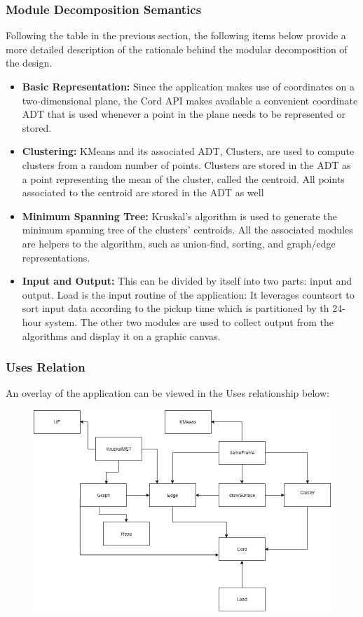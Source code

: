 \documentclass[12pt]{article}
\begin{document}
\subsubsection{Module Decomposition Semantics}
Following the table in the previous section, the following items below provide a more detailed
description of the rationale behind the modular decomposition of the design.
\begin{itemize}
\item \textbf{Basic Representation:} Since the application makes use of 
coordinates on a two-dimensional plane, the Cord API makes available a 
convenient coordinate ADT that is used whenever a point in the plane needs
to be represented or stored.
\item \textbf{Clustering:} KMeans and its associated ADT, Clusters, are used
to compute clusters from a random number of points. Clusters are stored in the
ADT as a point representing the mean of the cluster, called the centroid.
All points associated to the centroid are stored in the ADT as well
\item \textbf{Minimum Spanning Tree:} Kruskal's algorithm is used to generate
the minimum spanning tree of the clusters' centroids. All the associated modules
are helpers to the algorithm, such as union-find, sorting, and graph/edge
representations.
\item \textbf{Input and Output:} This can be divided by itself into two parts:
input and output. Load is the input routine of the application: It leverages
countsort to sort input data according to the pickup time which is 
partitioned by th 24-hour system. The other two modules are used to collect
output from the algorithms and display it on a graphic canvas.
\end{itemize}

\newpage
\subsubsection{Uses Relation}
An overlay of the application can be viewed in the Uses relationship below:
\begin{figure}[h]
\centering
\includegraphics[width=1.0\textwidth]{UsesDiagram.png}
\end{figure}
\newpage
\end{document}

